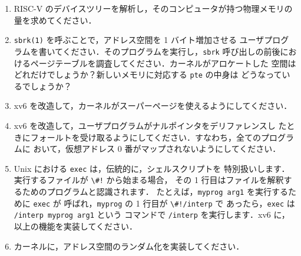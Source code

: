 \begin{enumerate}
  
\item RISC-V のデバイスツリーを解析し，そのコンピュータが持つ物理メモリの量を求めてください．

\item \lstinline{sbrk(1)} を呼ぶことで，アドレス空間を 1 バイト増加させる
  ユーザプログラムを書いてください．そのプログラムを実行し，\lstinline{sbrk} 
  呼び出しの前後におけるページテーブルを調査してください．カーネルがアロケートした
  空間はどれだけでしょうか？新しいメモリに対応する \lstinline{pte} の中身は
  どうなっているでしょうか？

\item xv6 を改造して，カーネルがスーパーページを使えるようにしてください．

\item xv6 を改造して，ユーザプログラムがナルポインタをデリファレンスし
  たときにフォールトを受け取るようにしてください．すなわち，全てのプログラムに
  おいて，仮想アドレス 0 番がマップされないようにしてください．

\item Unix における \lstinline{exec} は，伝統的に，シェルスクリプトを
  特別扱いします．実行するファイルが \lstinline{\#!} から始まる場合，
  その 1 行目はファイルを解釈するためのプログラムと認識されます．
  たとえば，\lstinline{myprog arg1} を実行するために \lstinline{exec} が
  呼ばれ，\lstinline{myprog} の 1 行目が \lstinline{\#!/interp} で
  あったら，\lstinline{exec} は \lstinline{/interp myprog arg1} という
  コマンドで \lstinline{/interp} を実行します．xv6 に，以上の機能を実装してください．

\item カーネルに，アドレス空間のランダム化を実装してください．

\end{enumerate}

